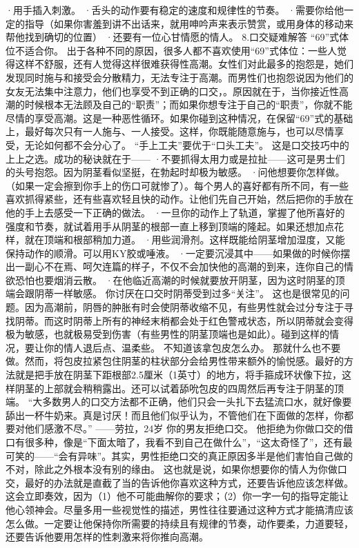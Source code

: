 \documentclass[12pt,UTF8,openany]{ctexbook}
\begin{document}
·用手插入刺激。
·舌头的动作要有稳定的速度和规律性的节奏。
·需要你给他一定的指导（如果你害羞到讲不出话来，就用呻吟声来表示赞赏，或用身体的移动来帮他找到确切的位置）
·还要有一位心甘情愿的情人。
8.口交疑难解答
“69”式体位不适合你。
出于各种不同的原因，很多人都不喜欢使用“69”式体位：一些人觉得这样不舒服，还有人觉得这样很难获得性高潮。女性们对此最多的抱怨是，她们发现同时施与和接受会分散精力，无法专注于高潮。而男性们也抱怨说因为他们的女友无法集中注意力，他们也享受不到正确的口交，。原因就在于，当你接近性高潮的时候根本无法顾及自己的“职责”；而如果你想专注于自己的“职责”，你就不能尽情的享受高潮。这是一种恶性循环。如果你碰到这种情况，在保留“69”式的基础上，最好每次只有一人施与、一人接受。这样，你既能随意施与，也可以尽情享受，无论如何都不会分心了。
“手上工夫”要优于“口头工夫”。
这是口交技巧中的上上之选。成功的秘诀就在于——
·不要抓得太用力或是拉扯——这可是男士们的头号抱怨。因为阴茎看似坚挺，在勃起时却极为敏感。
·问他想要你怎样做。（如果一定会擦到你手上的伤口可就惨了）。每个男人的喜好都有所不同，有一些喜欢抓得紧些，还有些喜欢轻且快的动作。让他们先自己开始，然后把你的手放在他的手上去感受一下正确的做法。
·一旦你的动作上了轨道，掌握了他所喜好的强度和节奏，就试着用手从阴茎的根部一直上移到顶端的隆起。如果还想加点花样，就在顶端和根部稍加力道。
·用些润滑剂。这样既能给阴茎增加湿度，又能保持动作的顺滑。可以用KY胶或唾液。
·一定要沉浸其中——如果做的时候你摆出一副心不在焉、呵欠连篇的样子，不仅不会加快他的高潮的到来，连你自己的情欲恐怕也要烟消云散。
·在他临近高潮的时候就要放开阴茎，因为这时阴茎的顶端会跟阴蒂一样敏感。
你讨厌在口交时阴蒂受到过多“关注”。
这也是很常见的问题。因为高潮前，阴唇的肿胀有时会使阴蒂收缩不见，有些男性就会过分专注于寻找阴蒂。而这时阴蒂上所有的神经末梢都会处于红色警戒状态，所以阴蒂就会变得极为敏感，也就极易受到伤害（有些男性的阴茎顶端也是如此）。碰到这样的情况，要让你的情人退后点、温柔些。
不知道该拿包皮怎么办。
那就什么也不要做。然而，将包皮拉紧包住阴茎的柱状部分会给男性带来额外的愉悦感。最好的方法就是把手放在阴茎下距根部2.5厘米（1英寸）的地方，将手箍成环状像下拉，这样阴茎的上部就会稍稍露出。还可以试着舔吮包皮的四周然后再专注于阴茎的顶端。
“大多数男人的口交方法都不正确，他们只会一头扎下去猛流口水，就好像要舔出一杯牛奶来。真是讨厌！而且他们似乎认为，不管他们在下面做的怎样，你都要对他们感激不尽。”
——劳拉，24岁
你的男友拒绝口交。
他拒绝为你做口交的借口有很多种，像是“下面太暗了，我看不到自己在做什么”，“这太奇怪了”，还有最可笑的——“会有异味”。其实，男性拒绝口交的真正原因多半是他们害怕自己做的不对，除此之外根本没有别的缘由。
这也就是说，如果你想要你的情人为你做口交，最好的办法就是直截了当的告诉他你喜欢这种方式，还要告诉他应该怎样做。
这会立即奏效，因为（1）他不可能曲解你的要求；（2）你一字一句的指导定能让他心领神会。尽量多用一些视觉性的描述，男性往往要通过这种方式才能搞清应该怎么做。一定要让他保持你所需要的持续且有规律的节奏，动作要柔，力道要轻，还要告诉他要用怎样的性刺激来将你推向高潮。
\end{document}

